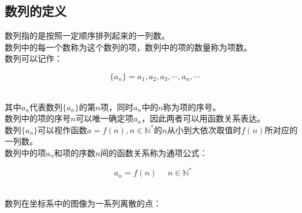\documentclass[UTF8]{ctexart}
\begin{document}
\subsection{数列的定义}
    数列指的是按照一定顺序排列起来的一列数。\\[3mm]
    数列中的每一个数称为这个数列的项，数列中的项的数量称为项数。\\[3mm]
    数列可以记作：
    \begin{large}
        \begin{equation*}
            ~~\{a_n\}=a_1,a_2,a_3,\cdots,a_n,\cdots
        \end{equation*}
    \end{large}\\
    其中$a_n$代表数列$\{a_n\}$的第$n$项，同时$a_n$中的$n$称为项的序号。\\[6mm]
    数列中的项的序号$n$可以唯一确定项$a_n$，因此两者可以用函数关系表达。\\[3mm]
    数列$\{a_n\}$可以视作函数$a=f(n),n\in\mathbb{N^*}$的$n$从小到大依次取值时$f(n)$所对应的一列数。\\[3mm]
    数列中的项$a_n$和项的序数$n$间的函数关系称为通项公式：
    \begin{large}
        \begin{equation*}
            a_n=f(n)~~~~~~n\in\mathbb{N^*}
        \end{equation*}
    \end{large}\\
    数列在坐标系中的图像为一系列离散的点：
\end{document}
